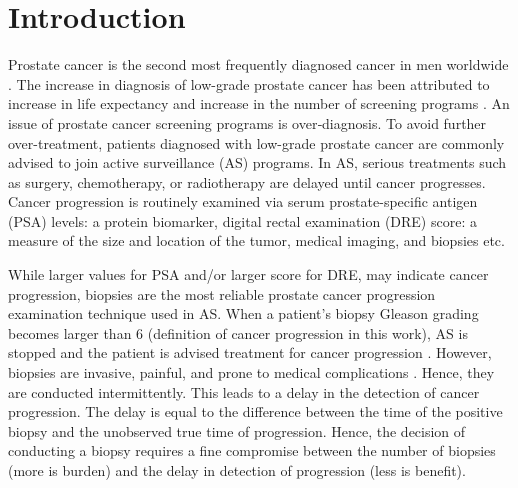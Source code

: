 
\section{Introduction}
\label{sec:introduction}
Prostate cancer is the second most frequently diagnosed cancer in men worldwide \cite{GlobalCancerStats2012}. The increase in diagnosis of low-grade prostate cancer has been attributed to increase in life expectancy and increase in the number of screening programs \cite{potoskyPSAcancer}. An issue of prostate cancer screening programs is over‐diagnosis. To avoid further over-treatment, patients diagnosed with low-grade prostate cancer are commonly advised to join active surveillance (AS) programs. In AS, serious treatments such as surgery, chemotherapy, or radiotherapy are delayed until cancer progresses. Cancer progression is routinely examined via serum prostate-specific antigen (PSA) levels: a protein biomarker, digital rectal examination (DRE) score: a measure of the size and location of the tumor, medical imaging, and biopsies etc.

While larger values for PSA and/or larger score for DRE, may indicate cancer progression, biopsies are the most reliable prostate cancer progression examination technique used in AS. When a patient's biopsy Gleason grading becomes larger than 6 (definition of cancer progression in this work), AS is stopped and the patient is advised treatment for cancer progression \cite{bokhorst2015compliance}. However, biopsies are invasive, painful, and prone to medical complications \cite{ehdaie2014impact}. Hence, they are conducted intermittently. This leads to a delay in the detection of cancer progression. The delay is equal to the difference between the time of the positive biopsy and the unobserved true time of progression. Hence, the decision of conducting a biopsy requires a fine compromise between the number of biopsies (more is burden) and the delay in detection of progression (less is benefit). 

